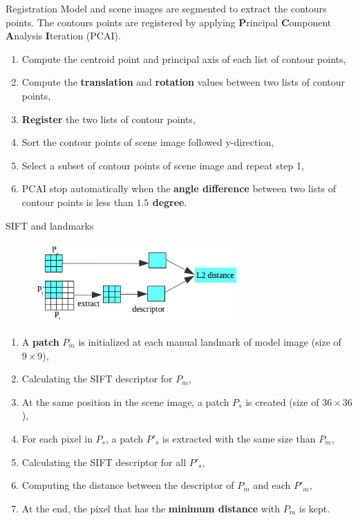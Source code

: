 \documentclass{LaBRI_poster}
\begin{document}
\begin{frame}[t]
\begin{columns}[t]
\begin{column}{\twocolwidth}
\begin{block}{Registration}
Model and scene images are segmented to extract the contours points. The contours points are registered by applying \textbf{P}rincipal \textbf{C}omponent \textbf{A}nalysis \cite{jolliffe2002principal} \textbf{I}teration (PCAI).
 \begin{enumerate}
    		\item Compute the centroid point and principal axis of each list of contour points,
    		\item Compute the \textbf{translation} and \textbf{rotation} values between two lists of contour points,
    		\item \textbf{Register} the two lists of contour points,
    		\item Sort the contour points of scene image followed y-direction,
    		\item Select a subset of contour points of scene image and repeat step 1,
    		\item PCAI stop automatically when the \textbf{angle difference} between two 
    	lists of contour points is less than \textbf{$1.5$ degree}.
    \end{enumerate}
\end{block}

\vspace{5pt}

\begin{block}{SIFT and landmarks}
\begin{figure}
    	 \centering
    	 \includegraphics[width=0.7\textwidth]{images/illustration}
    \end{figure}
    \begin{enumerate}
    		\item A \textbf{patch} $P_m$ is initialized at each manual landmark of model image (size of $9\times9$),
    		\item Calculating the SIFT\cite{lowe1999object} descriptor for $P_m$,
    		\item At the same position in the scene image, a patch $P_s$ is created (size of $36\times36$),
    		\item For each pixel in $P_s$, a patch $P'_s$ is extracted with the same size than $P_m$,
    		\item Calculating the SIFT descriptor for all $P'_s$,
    		\item Computing the distance between the descriptor of $P_m$ and each $P'_m$,
    		\item At the end, the pixel that has the \textbf{minimum distance} with $P_m$ is kept.
    \end{enumerate}
\end{block}


\end{column}
\end{columns}
\end{frame}
\end{document}
